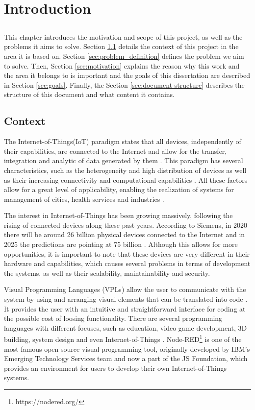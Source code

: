 \chapter{Introduction} \label{chap:intro} \minitoc

\section*{}

This chapter introduces the motivation and scope of this project, as well as the problems it aims to solve. Section \ref{sec:context} details the context of this project in the area it is based on. Section \ref{sec:problem_definition} defines the problem we aim to solve. Then, Section \ref{sec:motivation} explains the reason why this work and the area it belongs to is important and the goals of this dissertation are described in Section \ref{sec:goals}. Finally, the Section \ref{sec:document structure} describes the structure of this document and what content it contains.

\section{Context} \label{sec:context}

The Internet-of-Things(IoT) paradigm states that all devices, independently of their capabilities, are connected to the Internet and allow for the transfer, integration and analytic of data generated by them \cite{IoT_principles_and_paradigms}. This paradigm has several characteristics, such as the heterogeneity and high distribution of devices as well as their increasing connectivity and computational capabilities \cite{SoS}. All these factors allow for a great level of applicability, enabling the realization of systems for management of cities, health services and industries \cite{6851114}.

The interest in Internet-of-Things has been growing massively, following the rising of connected devices along these past years. According to Siemens, in 2020 there will be around 26 billion physical devices connected to the Internet and in 2025 the predictions are pointing at 75 billion \cite{tanweer}. Although this allows for more opportunities, it is important to note that these devices are very different in their hardware and capabilities, which causes several problems in terms of development the systems, as well as their scalability, maintainability and security. 

Visual Programming Languages (VPLs) allow the user to communicate with the system by using and arranging visual elements that can be translated into code \cite{vpl-book}. It provides the user with an intuitive and straightforward interface for coding at the possible cost of loosing functionality. There are several programming languages with different focuses, such as education, video game development, 3D building, system design and even Internet-of-Things \cite{survey_vpl_iot}. Node-RED\footnote{https://nodered.org/} is one of the most famous open source visual programming tool, originally developed by IBM’s Emerging Technology Services team and now a part of the JS Foundation, which provides an environment for users to develop their own Internet-of-Things systems.

